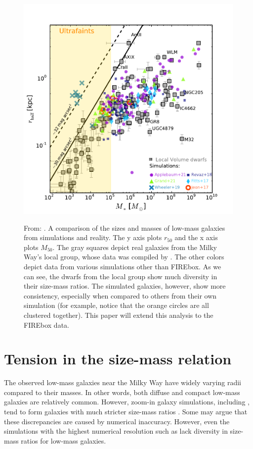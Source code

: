 \begin{figure}
    \centering
    \includegraphics*[width=\textwidth*2/3]{figs/sales/fig4.pdf}
    \label{fig:sales-size-mass}
    \caption{
        From: \cite{salesBaryonicSolutionsChallenges2022}. A comparison of the sizes and masses of low-mass galaxies from simulations and reality. The y axis plots $r_{50}$ and the x axis plots $M_{50}$. The gray squares depict real galaxies from the Milky Way's local group, whose data was compiled by \cite{mcconnachieOBSERVEDPROPERTIESDWARF2012}. The other colors depict data from various simulations other than FIREbox. As we can see, the dwarfs from the local group show much diversity in their size-mass ratios. The simulated galaxies, however, show more consistency, especially when compared to others from their own simulation (for example, notice that the orange circles are all clustered together). This paper will extend this analysis to the FIREbox data.
    }
\end{figure}


\section{Tension in the size-mass relation}

The observed low-mass galaxies near the Milky Way have widely varying radii compared to their masses. In other words, both diffuse and compact low-mass galaxies are relatively common. However, zoom-in galaxy simulations, including \cite{fittsFireFieldSimulating2017}, tend to form galaxies with much stricter size-mass ratios \citep{salesBaryonicSolutionsChallenges2022}. Some may argue that these discrepancies are caused by numerical inaccuracy. However, even the simulations with the highest numerical resolution such as \cite{wheelerBeItTherefore2019} lack diversity in size-mass ratios for low-mass galaxies. 

